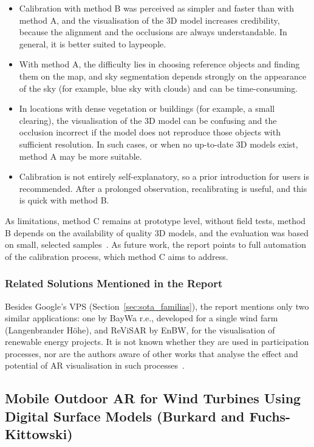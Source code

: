 \begin{itemize}
    \item Calibration with method B was perceived as simpler and faster than with method A, and the visualisation of the 3D model increases credibility, because the alignment and the occlusions are always understandable. In general, it is better suited to laypeople.
    \item With method A, the difficulty lies in choosing reference objects and finding them on the map, and sky segmentation depends strongly on the appearance of the sky (for example, blue sky with clouds) and can be time-consuming.
    \item In locations with dense vegetation or buildings (for example, a small clearing), the visualisation of the 3D model can be confusing and the occlusion incorrect if the model does not reproduce those objects with sufficient resolution. In such cases, or when no up-to-date 3D models exist, method A may be more suitable.
    \item Calibration is not entirely self-explanatory, so a prior introduction for users is recommended. After a prolonged observation, recalibrating is useful, and this is quick with method B.
\end{itemize}

As limitations, method C remains at prototype level, without field tests, method B depends on the availability of quality 3D models, and the evaluation was based on small, selected samples~\cite[Sec.~2.2.2.4 and 2.3]{ar4wind2023}. As future work, the report points to full automation of the calibration process, which method C aims to address.

\subsubsection{Related Solutions Mentioned in the Report}

Besides Google's VPS (Section~\ref{sec:sota_familias}), the report mentions only two similar applications: one by BayWa r.e., developed for a single wind farm (Langenbrander Höhe), and ReViSAR by EnBW, for the visualisation of renewable energy projects. It is not known whether they are used in participation processes, nor are the authors aware of other works that analyse the effect and potential of AR visualisation in such processes~\cite[Sec.~2.4]{ar4wind2023}.

\subsection{Mobile Outdoor AR for Wind Turbines Using Digital Surface Models (Burkard and Fuchs-Kittowski)}
\label{sec:burkard2022}

